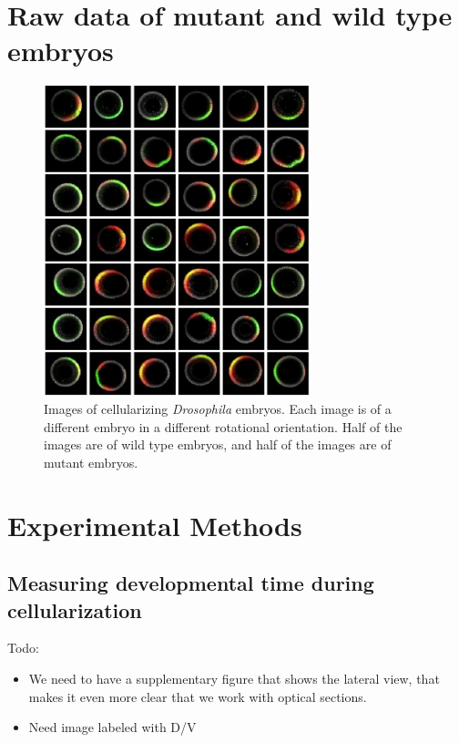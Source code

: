 \documentclass[12pt]{article}
\begin{document}
\section{Raw data of mutant and wild type embryos}

\begin{figure}[H]
\includegraphics[height=9cm]{raw_data3}
\caption{Images of cellularizing {\it Drosophila} embryos. Each image is of a different embryo in a different rotational orientation. Half of the images are of wild type embryos, and half of the images are of mutant embryos.}
\end{figure}


\section{Experimental Methods}

\subsection{Measuring developmental time during cellularization}

Todo:
\begin{itemize}
\item We need to have a supplementary figure that shows the lateral view, that makes it even more clear that we work with optical sections.

\item Need image labeled with D/V

\end{itemize}
\end{document}
